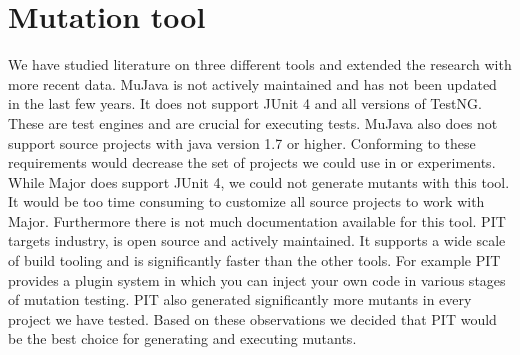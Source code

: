 \documentclass[../main]{subfiles}
\begin{document}
\section{Mutation tool}
We have studied literature on three different tools and extended the research with more recent data.
MuJava is not actively maintained and has not been updated in the last few years.
It does not support JUnit 4 and all versions of TestNG\cite{mujava}.
These are test engines and are crucial for executing tests.
MuJava also does not support source projects with java version 1.7 or higher\cite{mujava}.
Conforming to these requirements would decrease the set of projects we could use in or experiments.
\newline
While Major does support JUnit 4,
we could not generate mutants with this tool.
It would be too time consuming to customize all source projects to work with Major.
Furthermore there is not much documentation available for this tool.
\newline
PIT targets industry, is open source and actively maintained\cite{Kintis2016AnalysingStudy}.
It supports a wide scale of build tooling and is significantly faster than the other tools.
For example PIT provides a plugin system in which you can inject your own code in various stages of mutation testing\cite{pit}.
PIT also generated significantly more mutants in every project we have tested.
Based on these observations we decided that PIT would be the best choice for generating and executing mutants.
\end{document}
